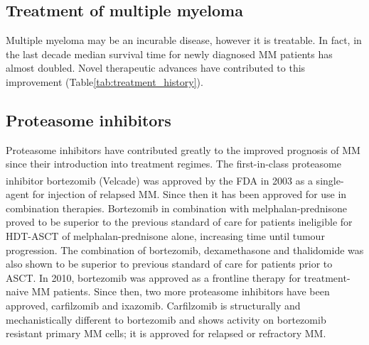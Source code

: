 \subsection{Treatment of multiple myeloma}
Multiple myeloma may be an incurable disease, however it is treatable.
In fact, in the last decade median survival time for newly diagnosed MM patients has almost doubled\cite{kazandjian2016look}.
Novel therapeutic advances have contributed to this improvement (Table\ref{tab:treatment_history}).



\subsection{Proteasome inhibitors}
Proteasome inhibitors have contributed greatly to the improved prognosis of MM since their introduction into treatment regimes.
The first-in-class proteasome inhibitor bortezomib (Velcade\textsuperscript{\textregistered}) was approved by the FDA in 2003 as a single-agent for injection of relapsed MM\cite{kane2003velcade}.
Since then it has been approved for use in combination therapies.
Bortezomib in combination with melphalan-prednisone proved to be superior to the previous standard of care for patients ineligible for HDT-ASCT of melphalan-prednisone alone, increasing time until tumour progression\cite{san2008bortezomib}.
The combination of bortezomib, dexamethasone and thalidomide  was also shown to be superior to previous standard of care for patients prior to ASCT\cite{moreau2012proteasome}.
In 2010, bortezomib was approved as a frontline therapy for treatment-naive MM patients.
Since then, two more proteasome inhibitors have been approved, carfilzomib and ixazomib.
Carfilzomib is structurally and mechanistically different to bortezomib and shows activity on bortezomib resistant primary MM cells\cite{moreau2012proteasome}; it is approved for relapsed or refractory MM\@.

